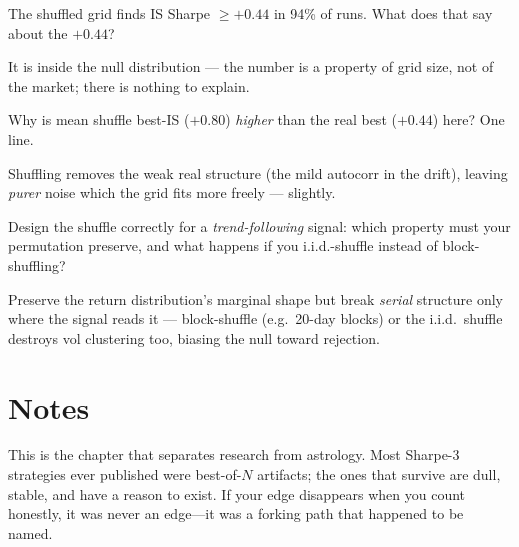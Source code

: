 \begin{exercise}[easy]
The shuffled grid finds IS Sharpe $\ge+0.44$ in 94\% of runs.
What does that say about the $+0.44$?
\end{exercise}
\begin{solution}
It is inside the null distribution --- the number is a property
of grid size, not of the market; there is nothing to explain.
\end{solution}
\begin{exercise}[medium]
Why is mean shuffle best-IS ($+0.80$) \emph{higher} than the real
best ($+0.44$) here? One line.
\end{exercise}
\begin{solution}
Shuffling removes the weak real structure (the mild autocorr in
the drift), leaving \emph{purer} noise which the grid fits
more freely --- slightly.
\end{solution}
\begin{exercise}[hard]
Design the shuffle correctly for a \emph{trend-following} signal:
which property must your permutation preserve, and what happens if
you i.i.d.-shuffle instead of block-shuffling?
\end{exercise}
\begin{solution}
Preserve the return distribution's marginal shape but break
\emph{serial} structure only where the signal reads it ---
block-shuffle (e.g.\ 20-day blocks) or the i.i.d.\ shuffle
destroys vol clustering too, biasing the null toward rejection.
\end{solution}

\section*{Notes}
This is the chapter that separates research from astrology. Most Sharpe-3 strategies
ever published were best-of-$N$ artifacts; the ones that survive are dull, stable, and
have a reason to exist. If your edge disappears when you count honestly, it was never
an edge---it was a forking path that happened to be named.

